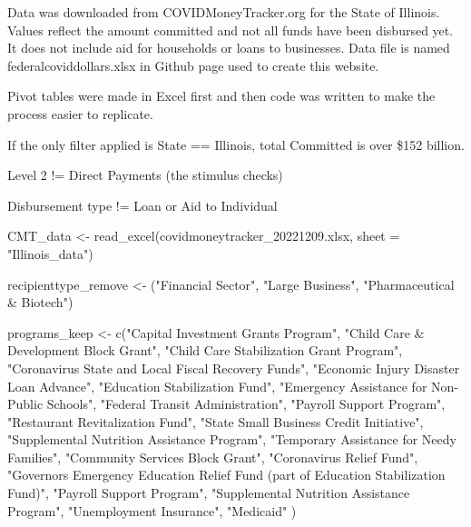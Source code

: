 \documentclass[
  letterpaper,
  DIV=11,
  numbers=noendperiod]{scrreport}
\newenvironment{Shaded}{\begin{snugshade}}{\end{snugshade}}
\newcommand{\AttributeTok}[1]{\textcolor[rgb]{0.40,0.45,0.13}{#1}}
\newcommand{\FunctionTok}[1]{\textcolor[rgb]{0.28,0.35,0.67}{#1}}
\newcommand{\NormalTok}[1]{\textcolor[rgb]{0.00,0.23,0.31}{#1}}
\newcommand{\OtherTok}[1]{\textcolor[rgb]{0.00,0.23,0.31}{#1}}
\newcommand{\StringTok}[1]{\textcolor[rgb]{0.13,0.47,0.30}{#1}}
\begin{document}
Data was downloaded from COVIDMoneyTracker.org for the State of
Illinois. Values reflect the amount committed and not all funds have
been disbursed yet. It does not include aid for households or loans to
businesses. Data file is named federalcoviddollars.xlsx in Github page
used to create this website.

Pivot tables were made in Excel first and then code was written to make
the process easier to replicate.

If the only filter applied is State == Illinois, total Committed is over
\$152 billion.

Level 2 != Direct Payments (the stimulus checks)

Disbursement type != Loan or Aid to Individual

\begin{Shaded}
\begin{Highlighting}[]
\NormalTok{CMT\_data }\OtherTok{\textless{}{-}} \FunctionTok{read\_excel}\NormalTok{(covidmoneytracker\_20221209.xlsx, }\AttributeTok{sheet =} \StringTok{"Illinois\_data"}\NormalTok{)}

\NormalTok{recipienttype\_remove }\OtherTok{\textless{}{-}}\NormalTok{ (}\StringTok{"Financial Sector"}\NormalTok{, }\StringTok{"Large Business"}\NormalTok{, }\StringTok{"Pharmaceutical \& Biotech"}\NormalTok{)}

\NormalTok{programs\_keep }\OtherTok{\textless{}{-}} \FunctionTok{c}\NormalTok{(}\StringTok{"Capital Investment Grants Program"}\NormalTok{,}
\StringTok{"Child Care \& Development Block Grant"}\NormalTok{,}
\StringTok{"Child Care Stabilization Grant Program"}\NormalTok{, }
\StringTok{"Coronavirus State and Local Fiscal Recovery Funds"}\NormalTok{,}
\StringTok{"Economic Injury Disaster Loan Advance"}\NormalTok{,}
\StringTok{"Education Stabilization Fund"}\NormalTok{,}
\StringTok{"Emergency Assistance for Non{-}Public Schools"}\NormalTok{,}
\StringTok{"Federal Transit Administration"}\NormalTok{,}
\StringTok{"Payroll Support Program"}\NormalTok{,}
\StringTok{"Restaurant Revitalization Fund"}\NormalTok{,}
\StringTok{"State Small Business Credit Initiative"}\NormalTok{,}
\StringTok{"Supplemental Nutrition Assistance Program"}\NormalTok{,}
\StringTok{"Temporary Assistance for Needy Families"}\NormalTok{,}
\StringTok{"Community Services Block Grant"}\NormalTok{,}
 \StringTok{"Coronavirus Relief Fund"}\NormalTok{,}
\StringTok{"Governor\textquotesingle{}s Emergency Education Relief Fund (part of Education Stabilization Fund)"}\NormalTok{,}
\StringTok{"Payroll Support Program"}\NormalTok{,}
\StringTok{"Supplemental Nutrition Assistance Program"}\NormalTok{, }\StringTok{"Unemployment Insurance"}\NormalTok{, }\StringTok{"Medicaid"}
\NormalTok{)}



\end{Highlighting}
\end{Shaded}
\end{document}
